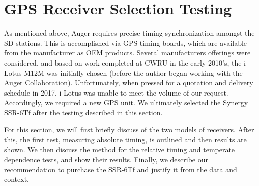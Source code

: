 \section{GPS Receiver Selection Testing} %
\label{gpstest}
As mentioned above, Auger requires precise timing synchronization amongst the SD stations. This is accomplished via GPS timing boards, which are available from the manufacturer as OEM products. Several manufacturers offerings were considered, and based on work completed at CWRU in the early 2010's, the i-Lotus M12M \cite{m12mspec} was initially chosen (before the author began working with the Auger Collaboration). Unfortunately, when pressed for a quotation and delivery schedule in 2017, i-Lotus was unable to meet the volume of our request. Accordingly, we required a new GPS unit. We ultimately selected the Synergy SSR-6Tf after the testing described in this section. %

For this section, we will first briefly discuss of the two models of receivers. After this, the first test, measuring absolute timing, is outlined and then results are shown. We then discuss the method for the relative timing and temperate dependence tests, and show their results. Finally, we describe our recommendation to purchase the SSR-6Tf and justify it from the data and context.

